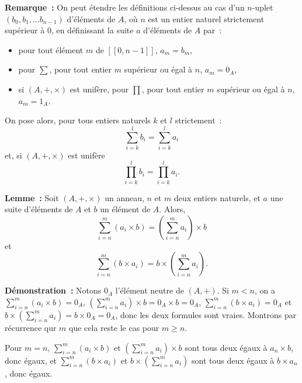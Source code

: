 \noindent\textbf{Remarque :} On peut étendre les définitions ci-dessus au cas d'un $n$-uplet $(b_0, b_1, \dots b_{n-1})$ d'éléments de $A$, où $n$ est un entier naturel strictement supérieur à $0$, en définissant la suite $a$ d'éléments de $A$ par : 
\begin{itemize}[nosep]
    \item pour tout élément $m$ de $[\![0, n-1]\!]$, $a_m = b_m$, 
    \item pour $\sum$, pour tout entier $m$ supérieur ou égal à $n$, $a_m = 0_A$, 
    \item si $(A, +, \times)$ est unifère, pour $\prod$, pour tout entier $m$ supérieur ou égal à $n$, $a_m = 1_A$.
\end{itemize}
On pose alors, pour tous entiers naturels $k$ et $l$ strictement : 
\begin{equation*}
    \sum_{i=k}^l b_i = \sum_{i=k}^l a_i
\end{equation*}
et, si $(A, +, \times)$ est unifère
\begin{equation*}
    \prod_{i=k}^l b_i = \prod_{i=k}^l a_i.
\end{equation*}

\medskip

\noindent\textbf{Lemme :} Soit $(A, +, \times)$ un anneau, $n$ et $m$ deux entiers naturels, et $a$ une suite d'éléments de $A$ et $b$ un élément de $A$. 
    Alors,
    \begin{equation*}
        \sum_{i=n}^m (a_i \times b) = \left( \sum_{i=n}^m a_i \right) \times b 
    \end{equation*}
    et
    \begin{equation*}
        \sum_{i=n}^m (b \times a_i) = b \times \left( \sum_{i=n}^m a_i \right) .
    \end{equation*}

\medskip

\noindent\textbf{Démonstration :} 
    Notons $0_A$ l'élément neutre de $(A, +)$.
    Si $m < n$, on a $\sum_{i=n}^m (a_i \times b) = 0_A$, $\left( \sum_{i=n}^m a_i \right) \times b = 0_A \times b = 0_A$, $\sum_{i=n}^m (b \times a_i) = 0_A$ et $b \times \left( \sum_{i=n}^m a_i \right) = b \times 0_A = 0_A$, donc les deux formules sont vraies.
    Montrons par récurrence qur $m$ que cela reste le cas pour $m \geq n$.

    Pour $m = n$, $\sum_{i=n}^m (a_i \times b)$ et $\left( \sum_{i=n}^m a_i \right) \times b$ sont tous deux égaux à $a_n \times b$, donc égaux, et $\sum_{i=n}^m (b \times a_i)$ et $b \times \left( \sum_{i=n}^m a_i \right)$ sont tous deux égaux à $b \times a_n$, donc égaux.

